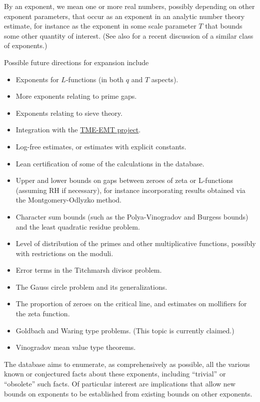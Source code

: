 By an exponent, we mean one or more real numbers, possibly depending on other exponent parameters, that occur as an exponent in an analytic number theory estimate, for instance as the exponent in some scale parameter $T$ that bounds some other quantity of interest. (See also \cite{elliott-antaaa} for a recent discussion of a similar class of exponents.)

Possible future directions for expansion include
\begin{itemize}
    \item Exponents for $L$-functions (in both $q$ and $T$ aspects).
    \item More exponents relating to prime gaps.
    \item Exponents relating to sieve theory.
    \item Integration with the \href{https://tmeemt.github.io/Chest/}{TME-EMT project}.
    \item Log-free estimates, or estimates with explicit constants.
    \item Lean certification of some of the calculations in the database.
    \item Upper and lower bounds on gaps between zeroes of zeta or L-functions (assuming RH if necessary), for instance incorporating results obtained via the Montgomery-Odlyzko method.
    \item Character sum bounds (such as the Polya-Vinogradov and Burgess bounds) and the least quadratic residue problem.
    \item Level of distribution of the primes and other multiplicative functions, possibly with restrictions on the moduli.
    \item Error terms in the Titchmarsh divisor problem.
    \item The Gauss circle problem and its generalizations.
    \item The proportion of zeroes on the critical line, and estimates on mollifiers for the zeta function.
    \item Goldbach and Waring type problems. (This topic is currently claimed.)
    \item Vinogradov mean value type theorems.
\end{itemize}

The database aims to enumerate, as comprehensively as possible, all the various known or conjectured facts about these exponents, including ``trivial'' or ``obsolete'' such facts.  Of particular interest are implications that allow new bounds on exponents to be established from existing bounds on other exponents.

